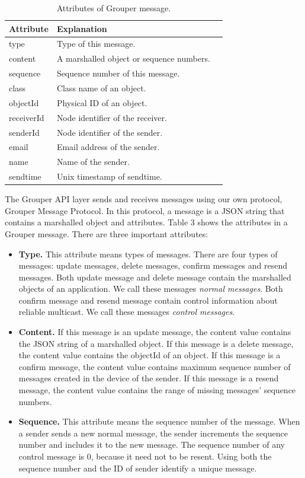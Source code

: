 \documentclass[twocolumn,10pt]{article}
\begin{document}
\begin{table}[t]
	\centering
	\caption{Attributes of Grouper message.}
	\label{my-label}
	\begin{tabular}{lll}
		\hline
		\textbf{Attribute} & \textbf{Explanation} \\ \hline
		type & Type of this message. \\
		content & A marshalled object or sequence numbers. \\
		sequence & Sequence number of this message. \\
		class & Class name of an object. \\
		objectId & Physical ID of an object. \\
		receiverId & Node identifier of the receiver. \\
		senderId & Node identifier of the sender. \\
		email & Email address of the sender. \\
		name & Name of the sender. \\
		sendtime & Unix timestamp of sendtime. \\
		\hline
	\end{tabular}
\end{table}

The Grouper API layer sends and receives messages using our own protocol, Grouper Message Protocol.
In this protocol, a message is a JSON string that contains a marshalled object and attributes.
Table 3 shows the attributes in a Grouper message.
There are three important attributes:

\begin{itemize}
	\setlength{\itemsep}{1pt}
	\setlength{\parskip}{0pt}
	\setlength{\parsep}{0pt}
	\item \textbf{Type.}
	This attribute means types of messages.
	There are four types of messages: update messages, delete messages, confirm messages and resend messages.
	Both update message and delete message contain the marshalled objects of an application.
	We call these messages \emph{normal messages}. 
	Both confirm message and resend message contain control information about reliable multicast. 
	We call these messages \emph{control messages}.
	\item \textbf{Content.} 
	If this message is an update message, the content value contains the JSON string of a marshalled object.
	If this message is a delete message, the content value contains the objectId of an object.
	If this message is a confirm message, the content value contains maximum sequence number of messages created in the device of the sender.
	If this message is a resend message, the content value contains the range of missing messages' sequence numbers.
	\item \textbf{Sequence.}
	This attribute means the sequence number of the message.
	When a sender sends a new normal message, the sender increments the sequence number and includes it to the new message.
	The sequence number of any control message is 0, because it need not to be resent.
	Using both the sequence number and the ID of sender identify a unique message.
\end{itemize}
\end{document}
